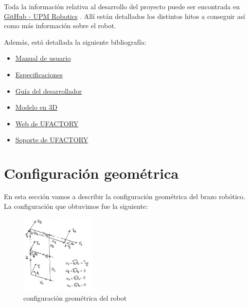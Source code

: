 \documentclass[a4paper,12pt]{article}
\begin{document}
Toda la información relativa al desarrollo del proyecto puede ser encontrada en
\href{https://github.com/UPM-Robotics/uarm}{GitHub - UPM Robotics} \cite{noauthor_upm-robotics/uarm_2019}. Allí están detallados
los distintos hitos a conseguir así como más información sobre el robot.

Además, está detallada la siguiente bibliografía:
\begin{itemize}
    \item \href{https://github.com/UPM-Robotics/uarm/blob/master/docs/robot-information/uArm%20pro%20User%20Manual%20v1.1.0.pdf}{Manual de usuario}
    \item \href{https://github.com/UPM-Robotics/uarm/blob/master/docs/robot-information/uArm-Swift-Specifications-171012.pdf}{Especificaciones}
    \item \href{https://github.com/UPM-Robotics/uarm/blob/master/docs/robot-information/uArm%20Swift%20Pro_Developer%20Guide%20v1.0.6.pdf}{Guía del desarrollador}
    \item \href{https://github.com/UPM-Robotics/uarm/blob/master/docs/robot-information/uArm_Swift_Pro_3D_20180620.STEP}{Modelo en 3D}
    \item \href{https://www.ufactory.cc/#/en/}{Web de UFACTORY}
    \item \href{https://www.ufactory.cc/#/en/support/technology}{Soporte de UFACTORY}
\end{itemize}

\section{Configuración geométrica}

En esta sección vamos a describir la configuración geométrica del brazo robótico. La
configuración que obtuvimos fue la siguiente:
\begin{figure}[H]
    \centering
    \includegraphics[height=4cm]{images/geometric_configuration.png}
    \caption{configuración geométrica del robot}
    \label{fig:robot_config}
\end{figure}
\end{document}
